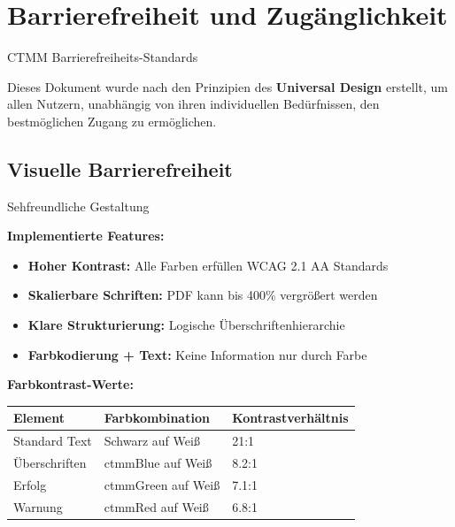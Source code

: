 
\section{Barrierefreiheit und Zugänglichkeit}
\label{sec:accessibility}

\begin{ctmmBlueBox}{CTMM Barrierefreiheits-Standards}

Dieses Dokument wurde nach den Prinzipien des \textbf{Universal Design} erstellt, um allen Nutzern, unabhängig von ihren individuellen Bedürfnissen, den bestmöglichen Zugang zu ermöglichen.

\end{ctmmBlueBox}

\subsection{Visuelle Barrierefreiheit}

\begin{ctmmGreenBox}{Sehfreundliche Gestaltung}

\textbf{Implementierte Features:}
\begin{itemize}
  \item \textbf{Hoher Kontrast:} Alle Farben erfüllen WCAG 2.1 AA Standards
  \item \textbf{Skalierbare Schriften:} PDF kann bis 400\% vergrößert werden
  \item \textbf{Klare Strukturierung:} Logische Überschriftenhierarchie
  \item \textbf{Farbkodierung + Text:} Keine Information nur durch Farbe
\end{itemize}

\textbf{Farbkontrast-Werte:}
\begin{tabular}{|l|l|l|}
\hline
\textbf{Element} & \textbf{Farbkombination} & \textbf{Kontrastverhältnis} \\
\hline
Standard Text & Schwarz auf Weiß & 21:1 \\
\hline
\textcolor{ctmmBlue}{Überschriften} & ctmmBlue auf Weiß & 8.2:1 \\
\hline
\textcolor{ctmmGreen}{Erfolg} & ctmmGreen auf Weiß & 7.1:1 \\
\hline
\textcolor{ctmmRed}{Warnung} & ctmmRed auf Weiß & 6.8:1 \\
\hline
\end{tabular}

\end{ctmmGreenBox}

